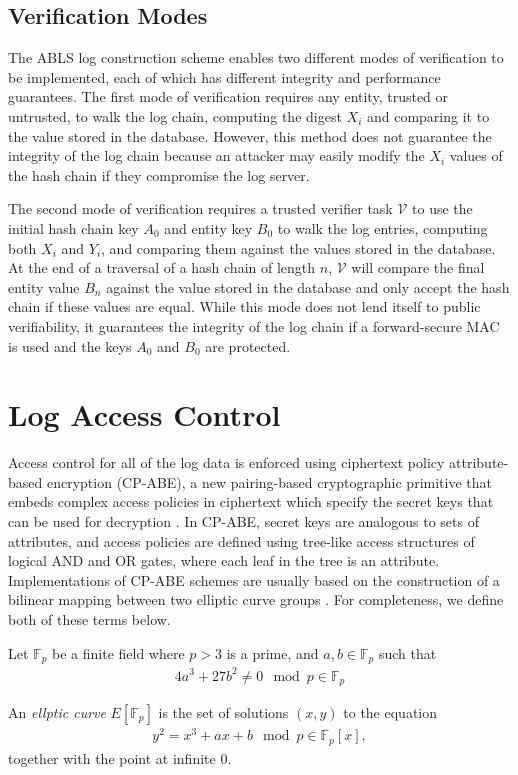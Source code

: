 \documentclass{sig-alternate}
\newenvironment{definition}[1][Definition]{\begin{trivlist}
\item[\hskip \labelsep {\bfseries #1}]}{\end{trivlist}}
\begin{document}
\subsection{Verification Modes}
\label{log:VerificationModes}

The ABLS log construction scheme enables two different modes of verification to be implemented,
each of which has different integrity and performance guarantees. The first mode of verification
requires any entity, trusted or untrusted, to walk the log chain, computing the digest $X_i$ and comparing it to the value
stored in the database. However, this method does not guarantee the integrity of the log chain because
an attacker may easily modify the $X_i$ values of the hash chain if they compromise the log server.

The second mode of verification requires a trusted verifier task $\mathcal{V}$ to use the initial
hash chain key $A_0$ and entity key $B_0$ to walk the log entries, computing both $X_i$ and $Y_i$,
and comparing them against the values stored in the database. At the end of a traversal of a hash chain of length $n$,
$\mathcal{V}$ will compare the final entity value $B_n$ against the value stored in the database and only accept
the hash chain if these values are equal. While this mode does not lend itself
to public verifiability, it guarantees the integrity of the log chain if a forward-secure MAC is used 
and the keys $A_0$ and $B_0$ are protected.

\section{Log Access Control}
Access control for all of the log data is enforced using ciphertext policy attribute-based encryption 
(CP-ABE), a new pairing-based cryptographic primitive that embeds complex
access policies in ciphertext which specify the secret keys that can be used for decryption \cite{Bethencourt2007-CPABE}. 
In CP-ABE, secret keys are analogous to sets of attributes, and access policies are defined using 
tree-like access structures of logical AND and OR gates, where each leaf in the tree is an attribute. Implementations of 
CP-ABE schemes are usually based on the construction of a bilinear mapping between two elliptic curve 
groups \cite{Bethencourt2007-CPABE} \cite{Junod2010-ABE}. For completeness, we define both of these terms below.

\begin{definition}
Let $\mathbb{F}_p$ be a finite field where $p > 3$ is a prime, and $a, b \in \mathbb{F}_p$ such that
\begin{align*}
4a^3 + 27b^2 \not= 0 \mod p \in \mathbb{F}_p
\end{align*}

An \emph{ellptic curve} $E[\mathbb{F}_p]$ is the set of solutions $(x, y)$ to the equation
\begin{align*}
y^2 = x^3 + ax + b \mod p \in \mathbb{F}_p[x],
\end{align*}
together with the point at infinite $0$.
\end{definition}
\end{document}
